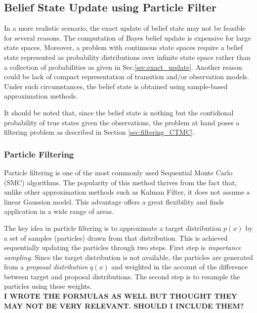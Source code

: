 \subsection{Belief State Update using Particle Filter}
In a more realistic scenario, the exact update of belief state may not be feasible for several reasons. The computation of Bayes belief update is expensive for large state spaces. Moreover, a problem with continuous state spaces require a belief state represented as probability distributions over infinite state space rather than a collection of probabilities as given in Sec.\ref{sec:exact_update}. \cite{Carlo1904} Another reason could be lack of compact representation of transition and/or observation models. Under such circumstances, the belief state is obtained using sample-based approximation methods. \cite{Carlo1904} 

It should be noted that, since the belief state is nothing but the contidional probability of true states given the observations, the problem at hand poses a filtering problem as described in Section \ref{sec:filtering_CTMC}.

\subsubsection{Particle Filtering}
Particle filtering is one of the most commonly used Sequential Monte Carlo (SMC) algorithms. The popularity of this method thrives from the fact that, unlike other approximation methods such as Kalman Filter, it does not assume a linear Gaussion model. This advantage offers a great flexibility and finds application in a wide range of areas.\cite{Doucet2009}

The key idea in particle filtering is to approximate a target distribution $ p(x) $ by a set of samples (particles) drawn from that distribution. This is achieved sequentially updating the particles through two steps. First step is \textit{importance sampling}. Since the target distribution is not available, the particles are generated from a \textit{proposal distribution} $ q(x) $ and weighted in the account of the difference between target and proposal distributions. The second step is to resample the particles using these weights. \cite{Godsill2019} \\
\textbf{I WROTE THE FORMULAS AS WELL BUT THOUGHT THEY MAY NOT BE VERY RELEVANT. SHOULD I INCLUDE THEM?}

